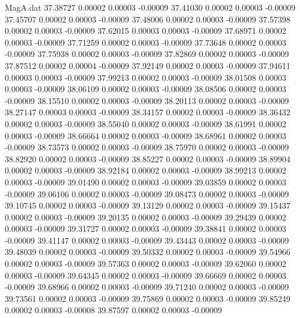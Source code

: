\begin{filecontents}{MagA.dat}
  37.38727    0.00002    0.00003   -0.00009
  37.41030    0.00002    0.00003   -0.00009
  37.45707    0.00002    0.00003   -0.00009
  37.48006    0.00002    0.00003   -0.00009
  37.57398    0.00002    0.00003   -0.00009
  37.62015    0.00003    0.00003   -0.00009
  37.68971    0.00002    0.00003   -0.00009
  37.71259    0.00002    0.00003   -0.00009
  37.73648    0.00002    0.00003   -0.00009
  37.75938    0.00002    0.00003   -0.00009
  37.82869    0.00002    0.00003   -0.00009
  37.87512    0.00002    0.00004   -0.00009
  37.92149    0.00002    0.00003   -0.00009
  37.94611    0.00003    0.00003   -0.00009
  37.99213    0.00002    0.00003   -0.00009
  38.01508    0.00003    0.00003   -0.00009
  38.06109    0.00002    0.00003   -0.00009
  38.08506    0.00002    0.00003   -0.00009
  38.15510    0.00002    0.00003   -0.00009
  38.20113    0.00002    0.00003   -0.00009
  38.27147    0.00003    0.00003   -0.00009
  38.34157    0.00002    0.00003   -0.00009
  38.36432    0.00002    0.00003   -0.00009
  38.55040    0.00002    0.00003   -0.00009
  38.61991    0.00002    0.00003   -0.00009
  38.66664    0.00002    0.00003   -0.00009
  38.68961    0.00002    0.00003   -0.00009
  38.73573    0.00002    0.00003   -0.00009
  38.75970    0.00002    0.00003   -0.00009
  38.82920    0.00002    0.00003   -0.00009
  38.85227    0.00002    0.00003   -0.00009
  38.89904    0.00002    0.00003   -0.00009
  38.92184    0.00002    0.00003   -0.00009
  38.99213    0.00002    0.00003   -0.00009
  39.01490    0.00002    0.00003   -0.00009
  39.03859    0.00002    0.00003   -0.00009
  39.06106    0.00002    0.00003   -0.00009
  39.08473    0.00002    0.00003   -0.00009
  39.10745    0.00002    0.00003   -0.00009
  39.13129    0.00002    0.00003   -0.00009
  39.15437    0.00002    0.00003   -0.00009
  39.20135    0.00002    0.00003   -0.00009
  39.29439    0.00002    0.00003   -0.00009
  39.31727    0.00002    0.00003   -0.00009
  39.38841    0.00002    0.00003   -0.00009
  39.41147    0.00002    0.00003   -0.00009
  39.43443    0.00002    0.00003   -0.00009
  39.48039    0.00002    0.00003   -0.00009
  39.50332    0.00002    0.00003   -0.00009
  39.54966    0.00002    0.00003   -0.00009
  39.57363    0.00002    0.00003   -0.00009
  39.62060    0.00002    0.00003   -0.00009
  39.64345    0.00002    0.00003   -0.00009
  39.66669    0.00002    0.00003   -0.00009
  39.68966    0.00002    0.00003   -0.00009
  39.71240    0.00002    0.00003   -0.00009
  39.73561    0.00002    0.00003   -0.00009
  39.75869    0.00002    0.00003   -0.00009
  39.85249    0.00002    0.00003   -0.00008
  39.87597    0.00002    0.00003   -0.00009

\end{filecontents}
